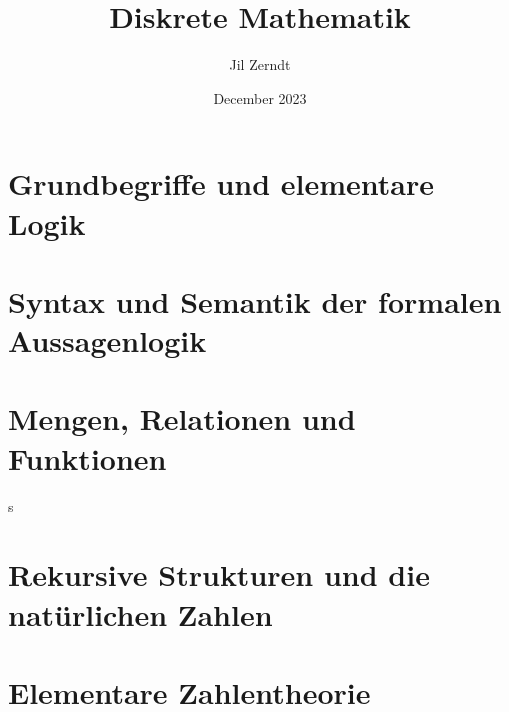 \documentclass[a4paper, fontsize = 7pt, landscape]{scrartcl}
\title{Diskrete Mathematik}
\author{Jil Zerndt}
\date{December 2023}
\begin{document}
\begin{multicols*}{3}
    \thispagestyle{TitlePageStyle}
		\maketitle
    \section{Grundbegriffe und elementare Logik}
        
        
        \raggedcolumns
        \columnbreak
        
    \section{Syntax und Semantik der formalen Aussagenlogik}
        
        
        \raggedcolumns
        \columnbreak
        

    \section{Mengen, Relationen und Funktionen}
        
        
        
        \raggedcolumns
        \columnbreak
        s
        \raggedcolumns
        \columnbreak
        

    \section{Rekursive Strukturen und die natürlichen Zahlen}
        
    \raggedcolumns
    \columnbreak
    
    \section{Elementare Zahlentheorie}
         
         \raggedcolumns
    \columnbreak
         
         
         



\end{multicols*}
\end{document}
